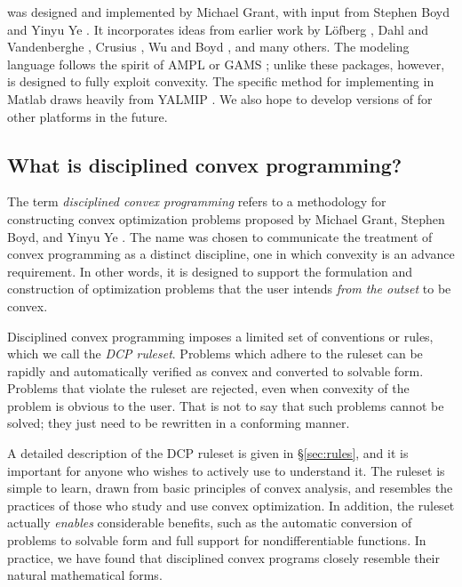 \documentclass[12pt]{article}
\begin{document}
\cvx was designed and implemented by Michael Grant, with input
from Stephen Boyd and Yinyu Ye \cite{GBY}. It
incorporates ideas from earlier work by 
L\"{o}fberg \cite{YALMIP}, 
Dahl and Vandenberghe \cite{CVXOPT}, 
Crusius \cite{Cru:02}, 
Wu and Boyd \cite{SDPSOL},
and many others.
The modeling language follows
the spirit of AMPL \cite{AMPL} or GAMS \cite{GAMS}; unlike
these packages, however, \cvx is designed to fully exploit convexity.
The specific method for implementing \cvx in Matlab
draws heavily from YALMIP \cite{YALMIP}. We also hope
to develop versions of \cvx for other platforms in the future.

\subsection{What is disciplined convex programming?}
\label{sec:what-is-dcp}

The term \emph{disciplined convex programming} refers to
a methodology for constructing convex optimization problems
proposed by Michael Grant, Stephen Boyd, and Yinyu Ye \cite{GBY,Gra:04}.
The name was chosen to communicate the treatment of convex
programming as a distinct discipline, one in which convexity is an
advance requirement. 
In other words, it is designed to support the formulation and
construction of optimization problems that the user 
intends \emph{from the outset} to be convex.

Disciplined convex programming imposes a limited
set of conventions or rules, which we call the \emph{DCP ruleset}.
Problems which adhere to the ruleset can be rapidly and automatically
verified as convex and converted to solvable form.
Problems that violate the ruleset are rejected, even when
convexity of the problem is obvious to the user.
That is not to say that such problems cannot be solved; they
just need to be rewritten in a conforming manner.

A detailed description of the DCP ruleset is given in \S\ref{sec:rules},
and it is important for anyone who wishes to actively use
\cvx to understand it.
The ruleset is simple 
to learn, drawn from basic principles of convex analysis,
and resembles the practices of those who study and use
convex optimization. In addition, the ruleset actually \emph{enables}
considerable benefits, such as the automatic conversion of
problems to solvable
form and full support for nondifferentiable
functions. In practice, we have found that
disciplined convex programs closely resemble
their natural mathematical forms.
\end{document}
